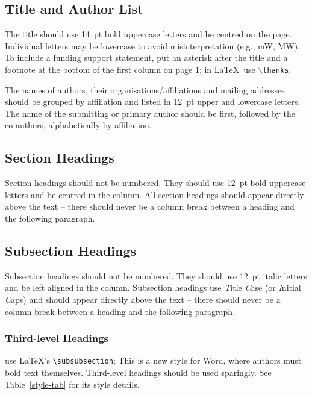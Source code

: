 \documentclass[a4paper]{jacow}
\begin{document}
\subsection{Title and Author List}

The title should use \SI{14}{pt} bold uppercase letters and be centred on the page.
Individual letters may be lowercase to avoid misinterpretation (e.g., mW, MW).
To include a funding support statement, put an asterisk after the title and a
footnote at the bottom of the first column on page 1; in \LaTeX\ use
$\backslash$\texttt{thanks}.

The names of authors, their organisations/affiliations and mailing addresses
should be grouped by affiliation and listed in \SI{12}{pt} upper and lowercase letters.
The name of the submitting or primary author should be first, followed by
the co-authors, alphabetically by affiliation.


\subsection{Section Headings}

Section headings should not be numbered. They should
use  \SI{12}{pt}  bold  uppercase  letters  and  be  centred  in  the
column. All section headings should appear directly above
the text -- there should never be a column break between a heading and the
following paragraph.

\subsection{Subsection Headings}

Subsection  headings  should  not  be  numbered.
They should use \SI{12}{pt} italic letters and be left aligned in the column.
Subsection headings use \emph{T}itle \emph{C}ase (or \emph{I}nitial \emph{C}aps)
and should appear directly above the text -- there should never be a column break
between a heading and the following paragraph.

\subsubsection{Third-level Headings} use \LaTeX's \verb|\subsubsection|;
This is a new style for Word, where authors must bold text themselves.
Third-level headings should be used sparingly. See Table~\ref{style-tab} for its
style details.
\end{document}
